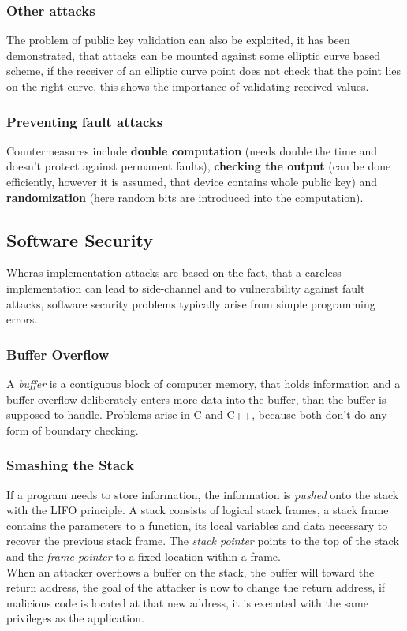 \documentclass[a4paper, 10 pt, conference]{ieeeconf}
\begin{document}
\vspace{0.5cm}
\subsubsection{\textbf{Other attacks}}
The problem of public key validation can also be exploited, it has been demonstrated, that attacks can be mounted against some elliptic curve based scheme, if the receiver of an elliptic curve point does not check that the point lies on the right curve, this shows the importance of validating received values. 
\vspace{0.5cm}
\subsubsection{\textbf{Preventing fault attacks}}
Countermeasures include \textbf{double computation} (needs double the time and doesn't protect against permanent faults), \textbf{checking the output} (can be done efficiently, however it is assumed, that device contains whole public key) and \textbf{randomization} (here random bits are introduced into the computation). 

\subsection{\textbf{Software Security}}
Wheras implementation attacks are based on the fact, that a careless implementation can lead to side-channel and to vulnerability against fault attacks, software security problems typically arise from simple programming errors. 

\vspace{0.5cm}
\subsubsection{\textbf{Buffer Overflow}}
A \emph{buffer} is a contiguous block of computer memory, that holds information and a buffer overflow deliberately enters more data into the buffer, than the buffer is supposed to handle. Problems arise in C and C++, because both don't do any form of boundary checking. 
\vspace{0.5cm}
\subsubsection{\textbf{Smashing the Stack}}
If a program needs to store information, the information is \emph{pushed} onto the stack with the LIFO principle. 
A stack consists of logical stack frames, a stack frame contains the parameters to a function, its local variables and data necessary to recover the previous stack frame. The \emph{stack pointer} points to the top of the stack and the \emph{frame pointer} to a fixed location within a frame. \\
When an attacker overflows a buffer on the stack, the buffer will toward the return address, the goal of the attacker is now to change the return address, if malicious code is located at that new address, it is executed with the same privileges as the application. 
\vspace{0.5cm}
\end{document}
